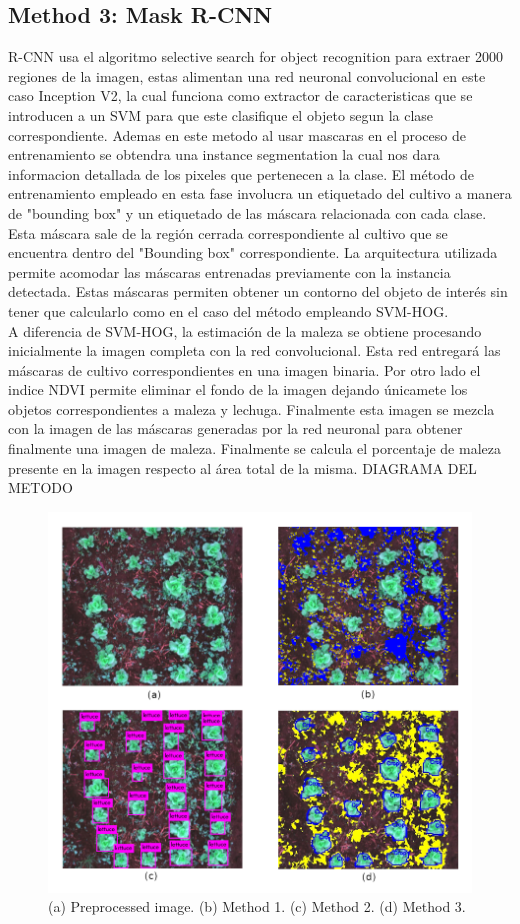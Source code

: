 \documentclass[journal,article,submit,moreauthors,pdftex]{Definitions/mdpi}
\begin{document}
\subsection{Method 3: Mask R-CNN}
R-CNN usa el algoritmo selective search for object recognition \cite{c54} para extraer 2000 regiones de la imagen, estas alimentan una red neuronal convolucional en este caso Inception V2, la cual funciona como extractor de caracteristicas que se introducen a un SVM para que este clasifique el objeto segun la clase correspondiente. Ademas en este metodo al usar mascaras en el proceso de entrenamiento se obtendra una instance segmentation \cite{c56} la cual nos dara informacion detallada de los pixeles que pertenecen a la clase. 
El método de entrenamiento empleado en esta fase involucra un etiquetado del cultivo a manera de "bounding box" y un etiquetado de las máscara relacionada con cada clase. Esta máscara sale de la región cerrada correspondiente al cultivo que se encuentra dentro del "Bounding box" correspondiente. La arquitectura utilizada \cite{c56} permite acomodar las máscaras entrenadas previamente con la instancia detectada. Estas máscaras permiten obtener un contorno del objeto de interés sin tener que calcularlo como en el caso del método empleando SVM-HOG.\\
A diferencia de SVM-HOG, la estimación de la maleza se obtiene procesando inicialmente la imagen completa con la red convolucional. Esta red entregará las máscaras de cultivo correspondientes en una imagen binaria. Por otro lado el indice NDVI permite eliminar el fondo de la imagen dejando únicamete los objetos correspondientes a maleza y lechuga. Finalmente esta imagen se mezcla con la imagen de las máscaras generadas por la red neuronal para obtener finalmente una imagen de maleza. Finalmente se calcula el porcentaje de maleza presente en la imagen respecto al área total de la misma.
\textcolor{correccion}{ DIAGRAMA DEL METODO }
\begin{figure}[H]
    \centering
    \includegraphics[scale=0.4]{Results.png}
     \centering
    \caption{ (a) Preprocessed image. (b) Method 1. (c) Method 2. (d) Method 3.}
\end{figure}
\end{document}
